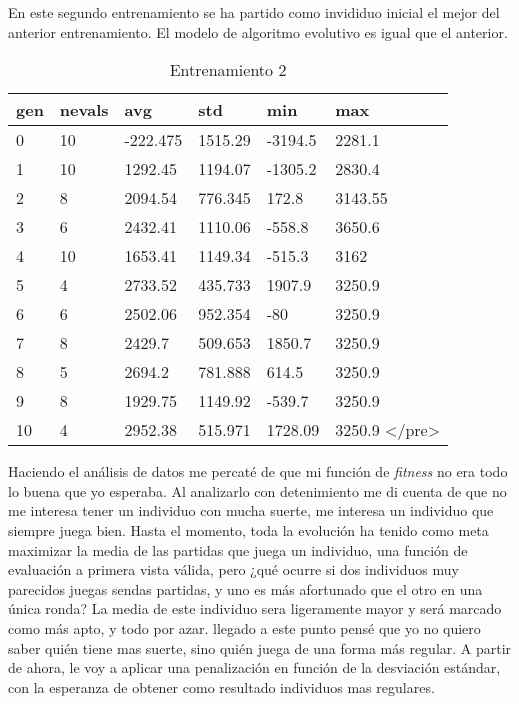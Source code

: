 En este segundo entrenamiento se ha partido como invididuo inicial el mejor del anterior entrenamiento. El modelo de algoritmo evolutivo es igual que el anterior.

\begin{table}[]
\centering
\begin{tabular}{|l|l|l|l|l|l|}
\hline
\rowcolor[HTML]{EFEFEF} 
gen & nevals & avg      & std     & min     & max                              \\ \hline
0   & 10     & -222.475 & 1515.29 & -3194.5 & 2281.1                           \\ \hline
1   & 10     & 1292.45  & 1194.07 & -1305.2 & 2830.4                           \\ \hline
2   & 8      & 2094.54  & 776.345 & 172.8   & 3143.55                          \\ \hline
3   & 6      & 2432.41  & 1110.06 & -558.8  & 3650.6                           \\ \hline
4   & 10     & 1653.41  & 1149.34 & -515.3  & 3162                             \\ \hline
5   & 4      & 2733.52  & 435.733 & 1907.9  & 3250.9                           \\ \hline
6   & 6      & 2502.06  & 952.354 & -80     & 3250.9                           \\ \hline
7   & 8      & 2429.7   & 509.653 & 1850.7  & 3250.9                           \\ \hline
8   & 5      & 2694.2   & 781.888 & 614.5   & 3250.9                           \\ \hline
9   & 8      & 1929.75  & 1149.92 & -539.7  & 3250.9                           \\ \hline
10  & 4      & 2952.38  & 515.971 & 1728.09 & 3250.9 \textless/pre\textgreater \\ \hline
\end{tabular}
\caption{Entrenamiento 2}
\label{tab:entr2}
\end{table}



Haciendo el análisis de datos me percaté de que mi función de \emph{fitness} no era todo lo buena que yo esperaba. Al analizarlo con detenimiento me di cuenta de que no me interesa tener un individuo con mucha suerte, me interesa un individuo que siempre juega bien. Hasta el momento, toda la evolución ha tenido como meta maximizar la media de las partidas que juega un individuo, una función de evaluación a primera vista válida, pero ¿qué ocurre si dos individuos muy parecidos juegas sendas partidas, y uno es más afortunado que el otro en una única ronda? La media de este individuo sera ligeramente mayor y será marcado como más apto, y todo por azar. llegado a este punto pensé que yo no quiero saber quién tiene mas suerte, sino quién juega de una forma más regular. A partir de ahora, le voy a aplicar una penalización en función de la desviación estándar, con la esperanza de obtener como resultado individuos mas regulares.



